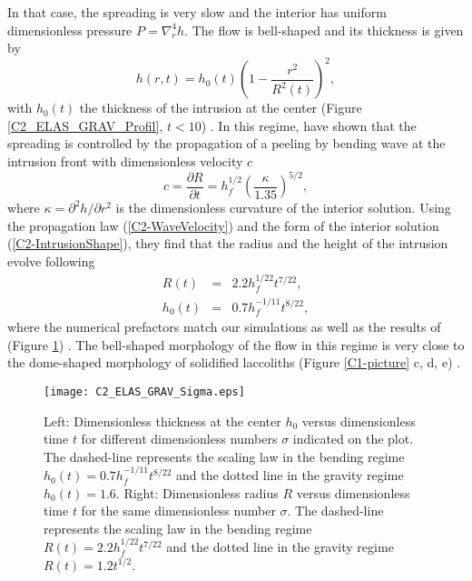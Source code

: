 In that case, the spreading is  very slow and the interior has uniform
dimensionless pressure $P =\nabla_r^4h$.   The flow is bell-shaped and
its thickness is given by
\begin{equation}
  h(r,t) = h_0(t)\left(1-\frac{r^2}{R^2(t)}\right)^2,
  \label{C2-IntrusionShape}
\end{equation}
with $h_0(t)$  the thickness  of the intrusion  at the  center (Figure
\ref{C2_ELAS_GRAV_Profil},                                     $t<10$)
\citep{Michaut:2011kg,Lister:2013ia}.       In       this      regime,
\citet{Lister:2013ia} have  shown that the spreading  is controlled by
the propagation  of a peeling by  bending wave at the  intrusion front
with dimensionless velocity $c$
\begin{equation}
  c=    \frac{\partial             R}{\partial            t}             =h_f^{1/2}
  \left(\frac{\kappa}{1.35}\right)^{5/2},
  \label{C2-WaveVelocity}
\end{equation}
where  $\kappa  =  \partial^2  h/\partial r^2$  is  the  dimensionless
curvature  of  the  interior  solution.   Using  the  propagation  law
(\ref{C2-WaveVelocity})  and   the  form  of  the   interior  solution
(\ref{C2-IntrusionShape}), they find that the radius and the height of
the intrusion evolve following
\begin{eqnarray}
  R(t) &=& 2.2h_f^{1/22}t^{7/22},\label{C2-ScalingR}\\
  h_0(t)&=&0.7 h_f^{-1/11}t^{8/22},\label{C2-ScalingH}
\end{eqnarray}
where the  numerical prefactors match  our simulations as well  as the
results  of  \citet{Lister:2013ia}  (Figure  \ref{C2_ELAS_GRAV_Sigma})
. The bell-shaped morphology of the  flow in this regime is very close
to  the  dome-shaped  morphology   of  solidified  laccoliths  (Figure
\ref{C1-picture} c, d, e) \citep{Michaut:2011kg}.

\begin{figure}[h!]
  \begin{center}
    \graphicspath{ {/Users/thorey/Documents/These/Manuscript/Figure/Chapter2/} }
    \texttt{[image: C2\_ELAS\_GRAV\_Sigma.eps]}
    \caption{Left: Dimensionless thickness at  the center $h_0$ versus
      dimensionless  time  $t$  for  different  dimensionless  numbers
      $\sigma$ indicated on the  plot.  The dashed-line represents the
      scaling       law       in        the       bending       regime
      $h_0(t)=0.7  h_f^{-1/11}t^{8/22}$ and  the  dotted  line in  the
      gravity regime $h_0(t) =  1.6$.  Right: Dimensionless radius $R$
      versus dimensionless time $t$  for the same dimensionless number
      $\sigma$.   The dashed-line  represents the  scaling law  in the
      bending  regime $R(t)  = 2.2h_f^{1/22}t^{7/22}$  and the  dotted
      line in the gravity regime $R(t) = 1.2t^{1/2}$.}
    \label{C2_ELAS_GRAV_Sigma}
  \end{center}
\end{figure}

